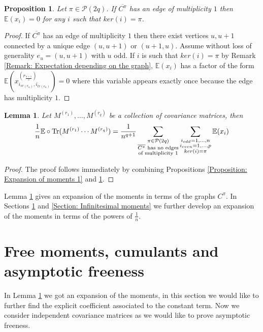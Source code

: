 \documentclass{article}
\newtheorem{lemma}      [theorem]{Lemma}
\newtheorem{proposition}[theorem]{Proposition}
\theoremstyle{definition}
\newcommand{\E}{\mathbb{E}}
\newcommand{\cP}{\mathcal{P}}
\newcommand{\Tr}{\text{Tr}}
\begin{document}
{\begin{proposition}\label{Proposition: Graph must have edges mult at least two}
Let $\pi\in \cP(2q)$. If $\overline{C^\pi}$ has an edge of multiplicity $1$ then $\E(x_i)=0$ for any $i$ such that $ker(i)=\pi$.
\end{proposition}
\begin{proof}
If $\overline{C^\pi}$ has an edge of multiplicity $1$ then there exist vertices $u,u+1$ connected by a unique edge $(u,u+1)$ or $(u+1,u)$. Assume without loss of generality $e_u=(u,u+1)$ with $u$ odd. If $i$ is such that $ker(i)=\pi$ by Remark \ref{Remark: Expectation depending on the graph}, $\E(x_i)$ has a factor of the form $\E(x_{i_{sr(e_u)},i_{tr(e_u)}}^{(r_{\frac{u+1}{2}})})=0$ where this variable appears exactly once because the edge has multiplicity $1$.
\end{proof}

\begin{lemma}\label{Lemma: Expansion of moments 2}
Let $M^{(r_1)},\dots,M^{(r_q)}$ be a collection of covariance matrices, then
$$\frac{1}{n}\E\circ \textup{\Tr}(M^{(r_1)}\cdots M^{(r_q)})=\frac{1}{n^{q+1}}\sum_{\substack{\pi\in \cP(2q)\\ \overline{C^\pi} \text{ has no edges} \\\text{of multiplicity }1}}\sum_{\substack{i_{odd}=1,\dots,n \\ i_{even}=1,\dots,p \\ ker(i)=\pi}}\E(x_i)$$
\end{lemma}
\begin{proof}
The proof follows immediately by combining Propositions \ref{Proposition: Expansion of moments 1} and \ref{Proposition: Graph must have edges mult at least two}.
\end{proof}

Lemma \ref{Lemma: Expansion of moments 2} gives an expansion of the moments in terms of the graphs $C^\pi$. In Sections \ref{Section: Moments} and \ref{Section: Infinitesimal moments} we further develop an expansion of the moments in terms of the powers of $\frac{1}{n}$. 

\section{Free moments, cumulants and asymptotic freeness}\label{Section: Moments}

In Lemma \ref{Lemma: Expansion of moments 2} we got an expansion of the moments, in this section we would like to further find the explicit coefficient associated to the constant term. Now we consider independent covariance matrices as we would like to prove asymptotic freeness. 

}
\end{document}
